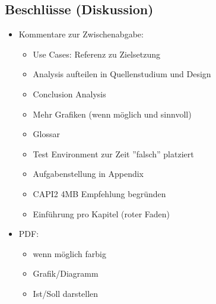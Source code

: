 \subsection*{Beschlüsse (Diskussion)}
\begin{itemize}
    \item Kommentare zur Zwischenabgabe:
    \begin{itemize}
        \item Use Cases: Referenz zu Zielsetzung
        \item Analysis aufteilen in Quellenstudium und Design
        \item Conclusion Analysis 
        \item Mehr Grafiken (wenn möglich und sinnvoll)
        \item Glossar 
        \item Test Environment zur Zeit ''falsch'' platziert
        \item Aufgabenstellung in Appendix
        \item CAPI2 4MB Empfehlung begründen
        \item Einführung pro Kapitel (roter Faden)
    \end{itemize}
    \item PDF: 
    \begin{itemize}
        \item wenn möglich farbig
        \item Grafik/Diagramm
        \item Ist/Soll darstellen
    \end{itemize}
\end{itemize}

